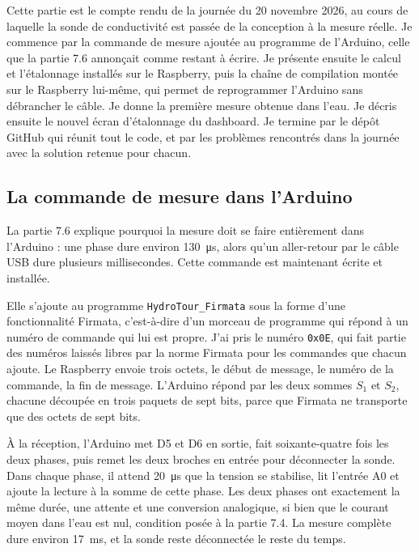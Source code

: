 \clearpage
{}

Cette partie est le compte rendu de la journée du 20 novembre 2026, au cours de laquelle la sonde de conductivité est passée de la conception à la mesure réelle. Je commence par la commande de mesure ajoutée au programme de l'Arduino, celle que la partie 7.6 annonçait comme restant à écrire. Je présente ensuite le calcul et l'étalonnage installés sur le Raspberry, puis la chaîne de compilation montée sur le Raspberry lui-même, qui permet de reprogrammer l'Arduino sans débrancher le câble. Je donne la première mesure obtenue dans l'eau. Je décris ensuite le nouvel écran d'étalonnage du dashboard. Je termine par le dépôt GitHub qui réunit tout le code, et par les problèmes rencontrés dans la journée avec la solution retenue pour chacun.

\subsection{La commande de mesure dans l'Arduino}

La partie 7.6 explique pourquoi la mesure doit se faire entièrement dans l'Arduino : une phase dure environ \qty{130}{\micro s}, alors qu'un aller-retour par le câble USB dure plusieurs millisecondes. Cette commande est maintenant écrite et installée.

Elle s'ajoute au programme \texttt{HydroTour\_Firmata} sous la forme d'une fonctionnalité Firmata, c'est-à-dire d'un morceau de programme qui répond à un numéro de commande qui lui est propre. J'ai pris le numéro \texttt{0x0E}, qui fait partie des numéros laissés libres par la norme Firmata pour les commandes que chacun ajoute. Le Raspberry envoie trois octets, le début de message, le numéro de la commande, la fin de message. L'Arduino répond par les deux sommes $S_1$ et $S_2$, chacune découpée en trois paquets de sept bits, parce que Firmata ne transporte que des octets de sept bits.

À la réception, l'Arduino met D5 et D6 en sortie, fait soixante-quatre fois les deux phases, puis remet les deux broches en entrée pour déconnecter la sonde. Dans chaque phase, il attend \qty{20}{\micro s} que la tension se stabilise, lit l'entrée A0 et ajoute la lecture à la somme de cette phase. Les deux phases ont exactement la même durée, une attente et une conversion analogique, si bien que le courant moyen dans l'eau est nul, condition posée à la partie 7.4. La mesure complète dure environ \qty{17}{ms}, et la sonde reste déconnectée le reste du temps.

